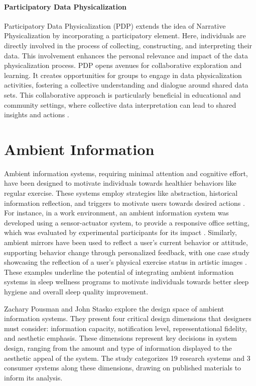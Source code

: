 \documentclass[
  a4paper,  %
  twoside,  %
  bibliography=totoc,
  headsepline,
  cleardoublepage=empty,
  parskip=half,
  draft=false
]{scrbook}
\begin{document}
\paragraph{Participatory Data Physicalization}
Participatory Data Physicalization (PDP) extends the idea of Narrative Physicalization by incorporating a participatory element. Here, individuals are directly involved in the process of collecting, constructing, and interpreting their data. This involvement enhances the personal relevance and impact of the data physicalization process. PDP opens avenues for collaborative exploration and learning. It creates opportunities for groups to engage in data physicalization activities, fostering a collective understanding and dialogue around shared data sets. This collaborative approach is particularly beneficial in educational and community settings, where collective data interpretation can lead to shared insights and actions \cite{10.1145/3173574.3173728}.
\section{Ambient Information}
Ambient information systems, requiring minimal attention and cognitive effort, have been designed to motivate individuals towards healthier behaviors like regular exercise. These systems employ strategies like abstraction, historical information reflection, and triggers to motivate users towards desired actions \cite{rodriguez_cammina_2013}. For instance, in a work environment, an ambient information system was developed using a sensor-actuator system, to provide a responsive office setting, which was evaluated by experimental participants for its impact \cite{streitz_ambient_2023}. Similarly, ambient mirrors have been used to reflect a user's current behavior or attitude, supporting behavior change through personalized feedback, with one case study showcasing the reflection of a user's physical exercise status in artistic images \cite{nakajima_designing_2013}.
These examples underline the potential of integrating ambient information systems in sleep wellness programs to motivate individuals towards better sleep hygiene and overall sleep quality improvement.

Zachary Pousman and John Stasko \cite{taxonomy} explore the design space of ambient information systems. They present four critical design dimensions that designers must consider: information capacity, notification level, representational fidelity, and aesthetic emphasis. These dimensions represent key decisions in system design, ranging from the amount and type of information displayed to the aesthetic appeal of the system. The study categorizes 19 research systems and 3 consumer systems along these dimensions, drawing on published materials to inform its analysis.
\end{document}
